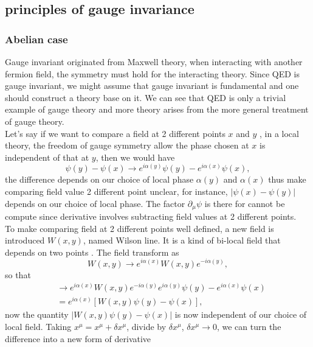 \documentclass{report}
\newcommand{\nn}{\nonumber}
\numberwithin{equation}{section}
\begin{document}
\subsection{principles of gauge invariance}\label{gaugeinvariant}
\subsubsection{Abelian case}
Gauge invariant originated from
Maxwell theory, when interacting with another fermion field, the
symmetry must hold for the interacting theory. Since QED is gauge
invariant, we might assume that gauge invariant is fundamental and one should construct a theory base on it. We can see that QED is only a trivial example of gauge theory and more theory arises from the more general treatment of gauge theory.\\
Let's say if we want to compare a field at 2 different points $x$ and $y$ , in a local theory, the freedom of gauge symmetry allow the phase chosen at $x$ is independent of that at $y$, then we would have
\begin{equation}
    \psi(y)-\psi(x)\rightarrow e^{i\alpha(y)}\psi(y)- e^{i\alpha(x)}\psi(x),
\end{equation}
the difference depends on our choice of local phase $\alpha(y)$ and $\alpha(x)$ thus make comparing field value 2 different point unclear, for instance, $|\psi(x)-\psi(y)|$ depends on our choice of local phase. The factor $\partial_\mu \psi$ is there for cannot be compute since derivative involves subtracting field values at 2 different points.\\
To make comparing field at 2 different points well defined, a new field is introduced $W(x,y)$, named Wilson line. It is a kind of
bi-local field that depends on two points \cite{Schwartz:2014sze}. The field transform as
\begin{equation}
    W(x,y)\rightarrow e^{i\alpha(x)} W(x,y)e^{-i\alpha(y)},
    \label{wilson}
\end{equation}
so that
\begin{align}
    [W(x,y)\psi(y)-\psi(x)]&\rightarrow  e^{i\alpha(x)} W(x,y)e^{-i\alpha(y)}e^{i\alpha(y)}\psi(y)-e^{i\alpha(x)}\psi(x)\nn\\
    &=e^{i\alpha(x)}[W(x,y)\psi(y)-\psi(x)],
\end{align}
now the quantity $|W(x,y)\psi(y)-\psi(x)|$ is now independent of our choice of local field. Taking $x^\mu=x^\mu+ \delta x^\mu$, divide by $\delta x^\mu$, $\delta x^\mu \rightarrow 0$, we can turn the difference into a new form of derivative
\end{document}
